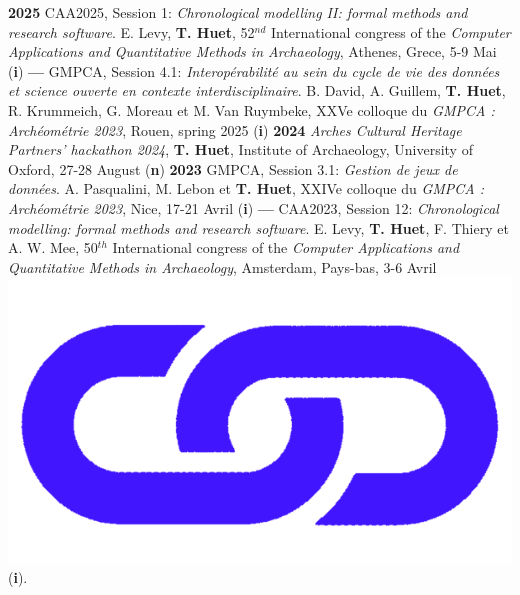 \documentclass{article}
\begin{document}
\textbf{2025 }CAA2025, Session 1: \textit{Chronological modelling II: formal methods and research software}. E. Levy, \textbf{T. Huet}, 52${}^{nd}$ International congress of the \textit{Computer Applications and Quantitative Methods in Archaeology}, Athenes, Grece, 5-9 Mai (\textbf{i})
\smallbreak
\textbf{--- }GMPCA, Session 4.1: \textit{Interopérabilité au sein du cycle de vie des données et science ouverte en contexte interdisciplinaire}. B. David, A. Guillem, \textbf{T. Huet}, R. Krummeich, G. Moreau et M. Van Ruymbeke, XXVe colloque du \textit{GMPCA : Archéométrie 2023}, Rouen, spring 2025 (\textbf{i})
\smallbreak
\textbf{2024 }\textit{Arches Cultural Heritage Partners' hackathon 2024}, \textbf{T. Huet}, Institute of Archaeology, University of Oxford, 27-28 August (\textbf{n})
\smallbreak
\textbf{2023 }GMPCA, Session 3.1: \textit{Gestion de jeux de données}. A. Pasqualini, M. Lebon et \textbf{T. Huet}, XXIVe colloque du \textit{GMPCA : Archéométrie 2023}, Nice, 17-21 Avril (\textbf{i})
\smallbreak
\textbf{--- }CAA2023, Session 12: \textit{Chronological modelling: formal methods and research software}. E. Levy, \textbf{T. Huet}, F. Thiery et A. W. Mee, 50${}^{th}$ International congress of the \textit{Computer Applications and Quantitative Methods in Archaeology}, Amsterdam, Pays-bas, 3-6 Avril \href{https://historical-time.github.io/caa23/s12/pres/#/title-slide}{\includegraphics[scale=0.015]{link_darkblue.png}} (\textbf{i}).
\smallbreak
\end{document}

